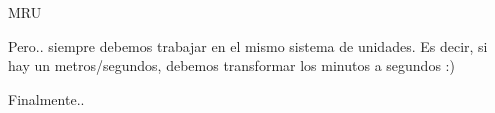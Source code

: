 \documentclass[%
final,
total,
slideBW,
colorBG,
pdf,
accumulate,
]{prosper}
\begin{document}
\begin{slide}{MRU}
% 
 
{\huge                
\xmru
}                                             
 
 
Pero.. siempre debemos trabajar en el mismo sistema de unidades.
Es decir, si hay un metros/segundos,
debemos transformar los 
minutos a segundos :)

\begin{center}
\end{center}
                           
 
Finalmente..                                                              
                                                               
                                                               
\end{slide}
\end{document}
